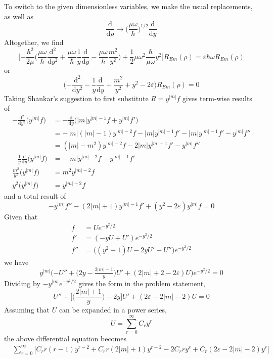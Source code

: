 \documentclass[../principles-of-quantum-mechanics.tex]{subfiles}
\begin{document}
\begin{questions}
\begin{solution}
		To switch to the given dimensionless variables, we make the usual replacements, as well as
		$$\frac{\mathrm{d}}{\mathrm{d}\rho} \to \Big(\frac{\mu\omega}{\hbar}\Big)^{1/2}\frac{\mathrm{d}}{\mathrm{d}y}$$
		Altogether, we find
		$$\Big[{-\frac{\hbar^2}{2\mu}}\Big(\frac{\mu\omega}{\hbar}\frac{\mathrm{d}^2}{\mathrm{d}y^2} + \frac{\mu\omega}{\hbar}\frac{1}{y}\frac{\mathrm{d}}{\mathrm{d}y} - \frac{\mu\omega}{\hbar}\frac{m^2}{y^2}\Big) + \frac{1}{2}\mu\omega^2\frac{\hbar}{\mu\omega}y^2\Big]R_{\textit{Em}}(\rho) = \varepsilon \hbar\omega R_{\textit{Em}}(\rho)$$
		or
		$$\Big({-\frac{\mathrm{d}^2}{\mathrm{d}y^2}} - \frac{1}{y}\frac{\mathrm{d}}{\mathrm{d}y} + \frac{m^2}{y^2} + y^2 - 2\varepsilon\Big)R_{\textit{Em}}(\rho) = 0$$
		Taking Shankar's suggestion to first substitute $R = y^{|m|}f$ gives term-wise results of
		\begin{align*}
			 -\frac{\mathrm{d}^2}{\mathrm{d}y^2}\big(y^{|m|}f\big) &= -\frac{\mathrm{d}}{\mathrm{d}y}\big(|m|y^{|m|-1}f + y^{|m|}f'\big) \\
			 &= -|m|(|m| - 1)y^{|m| - 2}f - |m|y^{|m| - 1}f' - |m|y^{|m| - 1}f' - y^{|m|}f'' \\
			 &= (|m| - m^2)y^{|m|-2}f - 2|m|y^{|m| - 1}f' - y^{|m|}f'' \\
			 -\frac{1}{y}\frac{\mathrm{d}}{\mathrm{d}y}\big(y^{|m|}f\big) &= -|m|y^{|m| - 2}f - y^{|m|-1}f' \\
			 \frac{m^2}{y^2}\big(y^{|m|}f\big) &= m^2y^{|m| - 2}f \\
			 y^2\big(y^{|m|}f\big) &= y^{|m| + 2}f
		\end{align*}
		and a total result of
		$$-y^{|m|}f'' - (2|m| + 1)y^{|m| - 1}f' + (y^{2} - 2\varepsilon)y^{|m|}f = 0$$
		Given that
		\begin{align*}
			f &= Ue^{-y^2/2} \\
			f' &= (-yU + U')e^{-y^2/2} \\
			f'' &= \big((y^2 - 1)U - 2yU' + U''\big)e^{-y^2/2}
		\end{align*}
		we have
		$$y^{|m|}\Big({-U''} + \big(2y - \tfrac{2|m| - 1}{y}\big)U' + (2|m| + 2 - 2\varepsilon)U\Big)e^{-y^2/2} = 0$$
		Dividing by $-y^{|m|}e^{-y^2/2}$ gives the form in the problem statement,
		$$U'' + \Big[\Big(\frac{2|m| + 1}{y}\Big) - 2y\Big]U' + (2\varepsilon - 2|m| - 2)U = 0$$
		Assuming that $U$ can be expanded in a power series,
		$$U = \sum_{r=0}^{\infty}C_ry^{r}$$
		the above differential equation becomes
		\begin{align*}
			&\sum_{r=0}^{\infty}\Big[C_rr(r - 1)y^{r - 2} + C_rr(2|m| + 1)y^{r - 2} - 2C_rry^{r} + C_r(2\varepsilon - 2|m| - 2)y^{r}\Big] \\

\end{align*}
\end{solution}
\end{questions}
\end{document}
